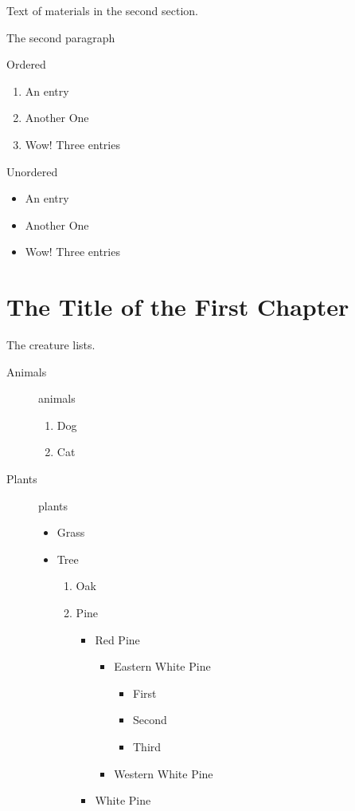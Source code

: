 \documentclass{report} %
\begin{document}
Text of materials in the second section.

The second paragraph

Ordered
\begin{enumerate}
  \item An entry
  \item Another One
  \item Wow! Three entries
\end{enumerate}

Unordered
\begin{itemize}
  \item An entry
  \item Another One
  \item Wow! Three entries
\end{itemize}

\chapter{The Title of the First Chapter}
The creature lists.

\begin{description}
  \item[Animals] animals
    \begin{enumerate}
      \item Dog
      \item Cat
    \end{enumerate}
  \item[Plants] plants
    \begin{itemize}
      \item Grass
      \item Tree
        \begin{enumerate}
          \item Oak
          \item Pine
            \begin{itemize}
              \item Red Pine
                \begin{itemize}
                  \item Eastern White Pine
                    \begin{itemize}
                      \item First
                      \item Second
                      \item Third
                    \end{itemize}
                  \item Western White Pine
                \end{itemize}
              \item White Pine
            \end{itemize}
        \end{enumerate}
    \end{itemize}

\end{description}
\end{document}
